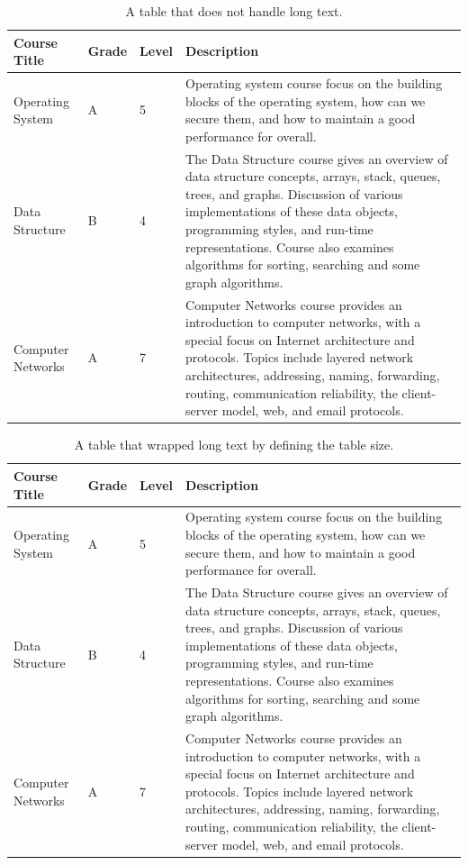 \begin{table}[H]
    \centering
    \begin{tabular}{llll}
        \hline\hline
        Course Title      & Grade & Level & Description \\ \hline\hline
        Operating System  & A     & 5     & Operating system course focus on the building blocks of the operating system, how can we secure them, and how to maintain a good performance for overall.\\
        Data Structure    & B     & 4     & The Data Structure course gives an overview of data structure concepts, arrays, stack, queues, trees, and graphs. Discussion of various implementations of these data objects, programming styles, and run-time representations. Course also examines algorithms for sorting, searching and some graph algorithms.\\
        Computer Networks & A     & 7     & Computer Networks course provides an introduction to computer networks, with a special focus on Internet architecture and protocols. Topics include layered network architectures, addressing, naming, forwarding, routing, communication reliability, the client-server model, web, and email protocols.\\ \hline
    \end{tabular}
    \caption{A table that does not handle long text.}
    \label{tab:over-boarder-table}
\end{table}

\begin{table}[H]
    \centering
    \begin{tabular}{p{}p{}p{}p{}}
        \hline\hline
        Course Title      & Grade & Level & Description \\ \hline\hline
        Operating System  & A     & 5     & Operating system course focus on the building blocks of the operating system, how can we secure them, and how to maintain a good performance for overall.\\
        Data Structure    & B     & 4     & The Data Structure course gives an overview of data structure concepts, arrays, stack, queues, trees, and graphs. Discussion of various implementations of these data objects, programming styles, and run-time representations. Course also examines algorithms for sorting, searching and some graph algorithms.\\
        Computer Networks & A     & 7     & Computer Networks course provides an introduction to computer networks, with a special focus on Internet architecture and protocols. Topics include layered network architectures, addressing, naming, forwarding, routing, communication reliability, the client-server model, web, and email protocols.\\ \hline
    \end{tabular}
    \caption{A table that wrapped long text by defining the table size.}
    \label{tab:wrapped-table}
\end{table}


